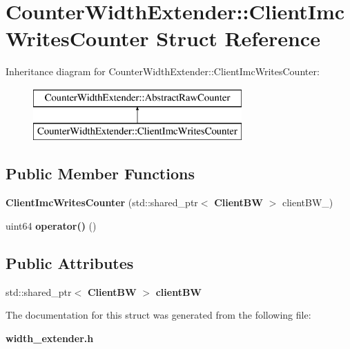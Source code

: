 \section{Counter\+Width\+Extender\+:\+:Client\+Imc\+Writes\+Counter Struct Reference}
\label{structCounterWidthExtender_1_1ClientImcWritesCounter}
Inheritance diagram for Counter\+Width\+Extender\+:\+:Client\+Imc\+Writes\+Counter\+:\begin{figure}[H]
\begin{center}
\leavevmode
\includegraphics[height=2.000000cm]{structCounterWidthExtender_1_1ClientImcWritesCounter}
\end{center}
\end{figure}
\subsection*{Public Member Functions}
\begin{DoxyCompactItemize}
\item 
{\bfseries Client\+Imc\+Writes\+Counter} (std\+::shared\+\_\+ptr$<$ {\bf Client\+BW} $>$ client\+B\+W\+\_\+)\label{structCounterWidthExtender_1_1ClientImcWritesCounter_a7df3cec47a653dadcb46368a5a3a1e85}

\item 
uint64 {\bfseries operator()} ()\label{structCounterWidthExtender_1_1ClientImcWritesCounter_a3156907cb67016aea3255b75d7a887cb}

\end{DoxyCompactItemize}
\subsection*{Public Attributes}
\begin{DoxyCompactItemize}
\item 
std\+::shared\+\_\+ptr$<$ {\bf Client\+BW} $>$ {\bfseries client\+BW}\label{structCounterWidthExtender_1_1ClientImcWritesCounter_a4dcb0451c4b5797040d3c439447312fc}

\end{DoxyCompactItemize}


The documentation for this struct was generated from the following file\+:\begin{DoxyCompactItemize}
\item 
{\bf width\+\_\+extender.\+h}\end{DoxyCompactItemize}
